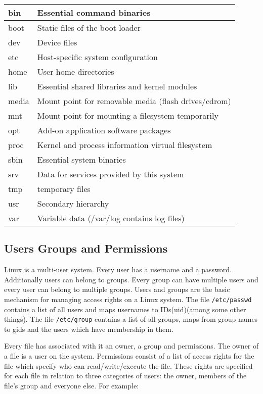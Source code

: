 \documentclass[10pt]{article}
\begin{document}
  \begin{tabular}{l|l}
    bin   & Essential command binaries         \\ \hline
    boot  & Static files of the boot loader    \\ \hline
    dev   & Device files                       \\ \hline
    etc   & Host-specific system configuration \\\hline
    home  & User home directories              \\\hline
    lib   & Essential shared libraries and kernel modules  \\\hline
    media & Mount point for removable media (flash drives/cdrom) \\\hline
    mnt   & Mount point for mounting a filesystem temporarily \\\hline
    opt   & Add-on application software packages   \\\hline
    proc  & Kernel and process information virtual filesystem  \\\hline
    sbin  & Essential system binaries \\\hline
    srv   & Data for services provided by this system  \\\hline
    tmp   & temporary files \\\hline
    usr   & Secondary hierarchy \\\hline
    var   & Variable data (/var/log contains log files)
  \end{tabular}

  \subsection{Users Groups and Permissions}
  Linux is a multi-user system. Every user has a username and a password. Additionally users can belong
  to groups. Every group can have multiple users and every user can belong to multiple groups. Users and 
  groups are the basic mechanism for managing access rights on a Linux system. 
  The file \texttt{/etc/passwd} contains a list of all users and maps usernames to IDs(uid)(among some other things). 
  The file \texttt{/etc/group} contains a list of all groups, maps from group names to gids and the users which have membership in them.

  Every file has associated with it an owner, a group and permissions. 
  The owner of a file is a user on the system. 
  Permissions consist of a list of access rights for the file which specify who
  can read/write/execute the file. These rights are specified for each file in relation to three categories of users: the owner, members of the file's group and everyone else. For example:
  
\end{document}
